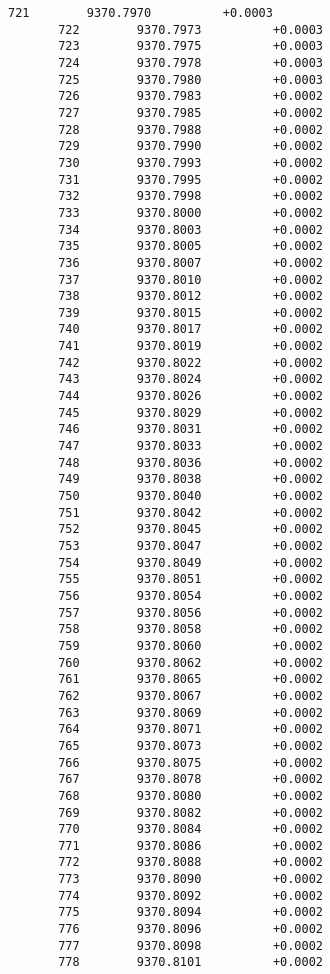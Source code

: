 \documentclass[11pt]{article}
\begin{document}
\begin{Verbatim}[commandchars=\\\{\}]
       721        9370.7970          +0.0003
       722        9370.7973          +0.0003
       723        9370.7975          +0.0003
       724        9370.7978          +0.0003
       725        9370.7980          +0.0003
       726        9370.7983          +0.0002
       727        9370.7985          +0.0002
       728        9370.7988          +0.0002
       729        9370.7990          +0.0002
       730        9370.7993          +0.0002
       731        9370.7995          +0.0002
       732        9370.7998          +0.0002
       733        9370.8000          +0.0002
       734        9370.8003          +0.0002
       735        9370.8005          +0.0002
       736        9370.8007          +0.0002
       737        9370.8010          +0.0002
       738        9370.8012          +0.0002
       739        9370.8015          +0.0002
       740        9370.8017          +0.0002
       741        9370.8019          +0.0002
       742        9370.8022          +0.0002
       743        9370.8024          +0.0002
       744        9370.8026          +0.0002
       745        9370.8029          +0.0002
       746        9370.8031          +0.0002
       747        9370.8033          +0.0002
       748        9370.8036          +0.0002
       749        9370.8038          +0.0002
       750        9370.8040          +0.0002
       751        9370.8042          +0.0002
       752        9370.8045          +0.0002
       753        9370.8047          +0.0002
       754        9370.8049          +0.0002
       755        9370.8051          +0.0002
       756        9370.8054          +0.0002
       757        9370.8056          +0.0002
       758        9370.8058          +0.0002
       759        9370.8060          +0.0002
       760        9370.8062          +0.0002
       761        9370.8065          +0.0002
       762        9370.8067          +0.0002
       763        9370.8069          +0.0002
       764        9370.8071          +0.0002
       765        9370.8073          +0.0002
       766        9370.8075          +0.0002
       767        9370.8078          +0.0002
       768        9370.8080          +0.0002
       769        9370.8082          +0.0002
       770        9370.8084          +0.0002
       771        9370.8086          +0.0002
       772        9370.8088          +0.0002
       773        9370.8090          +0.0002
       774        9370.8092          +0.0002
       775        9370.8094          +0.0002
       776        9370.8096          +0.0002
       777        9370.8098          +0.0002
       778        9370.8101          +0.0002

\end{Verbatim}
\end{document}
